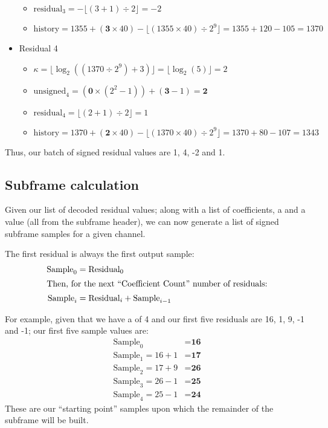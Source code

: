 \begin{itemize}
\begin{itemize}
\item $\text{residual}_3 = -\lfloor (3 + 1) \div 2 \rfloor = -2$
\item $\text{history} = 1355 + (\textbf{3} \times 40) - \lfloor(1355 \times 40) \div 2^9\rfloor = 1355 + 120 - 105 = 1370$
\end{itemize}
\item Residual 4
\begin{itemize}
\item $\kappa = \lfloor\log_2((1370 \div 2^9) + 3)\rfloor = \lfloor\log_2(5)\rfloor = 2$
\item $\text{unsigned}_4 = (\textbf{0} \times (2^2 - 1)) + (\textbf{3} - 1) = \textbf{2}$
\item $\text{residual}_4 = \lfloor (2 + 1) \div 2 \rfloor = 1$
\item $\text{history} = 1370 + (\textbf{2} \times 40) - \lfloor(1370 \times 40) \div 2^9\rfloor = 1370 + 80 - 107 = 1343$
\end{itemize}
\end{itemize}
Thus, our batch of signed residual values are 1, 4, -2 and 1.

\clearpage

\subsection{Subframe calculation}


Given our list of decoded residual values;
along with a list of coefficients,
a  and a  value
(all from the subframe header),
we can now generate a list of signed subframe samples for a
given channel.

The first residual is always the first output sample:
\begin{align*}
\text{Sample}_0 &= \text{Residual}_0 \\
\intertext{Then, for the next ``{Coefficient Count}'' number of residuals:}
\text{Sample}_i &= \text{Residual}_i + \text{Sample}_{i - 1}
\end{align*}

For example, given that we have a  of 4
and our first five residuals are 16, 1, 9, -1 and -1;
our first five sample values are:
\begin{align*}
\text{Sample}_0 &= \textbf{16} \\
\text{Sample}_1 = 16 + 1 &= \textbf{17} \\
\text{Sample}_2 = 17 + 9 &= \textbf{26} \\
\text{Sample}_3 = 26 - 1 &= \textbf{25} \\
\text{Sample}_4 = 25 - 1 &= \textbf{24}
\end{align*}
These are our ``starting point'' samples upon which the remainder
of the subframe will be built.

